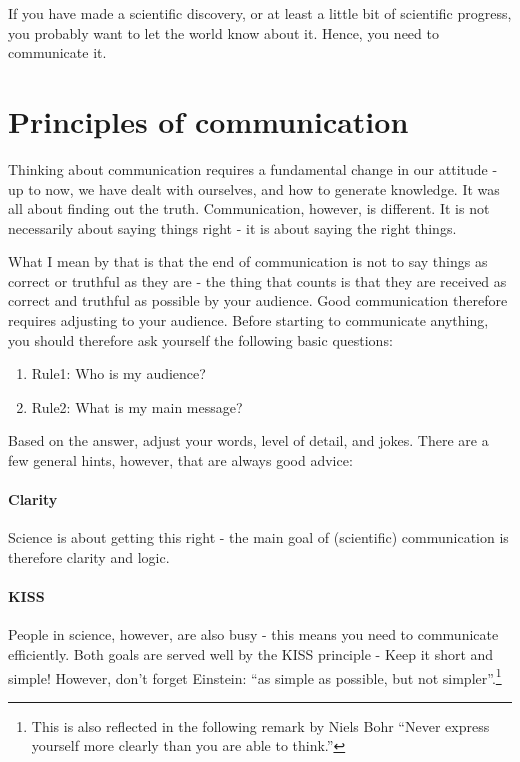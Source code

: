 \documentclass{tufte-book}
\begin{document}
If you have made a scientific discovery, or at least a little bit of scientific progress, you probably want to let the world know about it. Hence, you need to communicate it.

\section{Principles of communication}

Thinking about communication requires a fundamental change in our attitude - up to now, we have dealt with ourselves, and how to generate knowledge. It was all about finding out the truth. Communication, however, is different. It is not necessarily about saying things right - it is about saying the right things. 

What I mean by that is that the end of communication is not to say things as correct or truthful as they are - the thing that counts is that they are received as correct and truthful as possible by your audience. Good communication therefore requires adjusting to your audience. Before starting to communicate anything, you should therefore ask yourself the following basic questions:


\begin{enumerate}
\item Rule1: Who is my audience?
\item Rule2: What is my main message?
\end{enumerate}

Based on the answer, adjust your words, level of detail, and jokes. There are a few general hints, however, that are always good advice:

\paragraph{Clarity} Science is about getting this right - the main goal of (scientific) communication is therefore clarity and logic. 

\paragraph{KISS} People in science, however, are also busy - this means you need to communicate efficiently. Both goals are served well by the KISS principle - Keep it short and simple! However, don't forget Einstein: ``as simple as possible, but not simpler''.\footnote{This is also reflected in the following remark by Niels Bohr ``Never express yourself more clearly than you are able to think.''}
\end{document}
